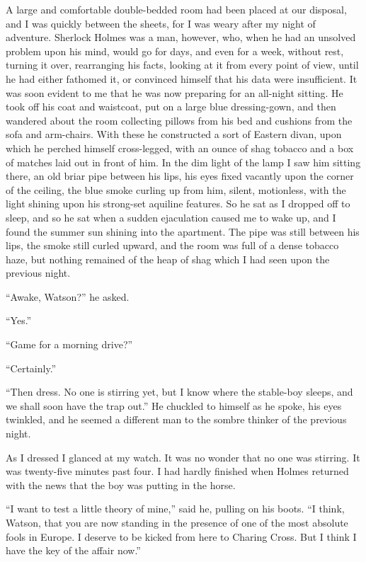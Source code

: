 A large and comfortable double-bedded room had been
placed at our disposal, and I was quickly between the sheets,
for I was weary after my night of adventure. Sherlock
Holmes was a man, however, who, when he had an unsolved
problem upon his mind, would go for days, and even for a
week, without rest, turning it over, rearranging his facts, looking
at it from every point of view, until he had either fathomed
it, or convinced himself that his data were insufficient.
It was soon evident to me that he was now preparing for an
all-night sitting. He took off his coat and waistcoat, put on
a large blue dressing-gown, and then wandered about the
room collecting pillows from his bed and cushions from the
sofa and arm-chairs. With these he constructed a sort of
Eastern divan, upon which he perched himself cross-legged,
with an ounce of shag tobacco and a box of matches laid out
in front of him. In the dim light of the lamp I saw him sitting
there, an old briar pipe between his lips, his eyes fixed
vacantly upon the corner of the ceiling, the blue smoke curling
up from him, silent, motionless, with the light shining upon
his strong-set aquiline features. So he sat as I dropped off
to sleep, and so he sat when a sudden ejaculation caused me
to wake up, and I found the summer sun shining into the
apartment. The pipe was still between his lips, the smoke
still curled upward, and the room was full of a dense tobacco
haze, but nothing remained of the heap of shag which I had
seen upon the previous night.

“Awake, Watson?” he asked.

“Yes.”

“Game for a morning drive?”

“Certainly.”

“Then dress. No one is stirring yet, but I know where the
stable-boy sleeps, and we shall soon have the trap out.” He
chuckled to himself as he spoke, his eyes twinkled, and he
seemed a different man to the sombre thinker of the previous
night.

As I dressed I glanced at my watch. It was no wonder
that no one was stirring. It was twenty-five minutes past
four. I had hardly finished when Holmes returned with the
news that the boy was putting in the horse.

“I want to test a little theory of mine,” said he, pulling on
his boots. “I think, Watson, that you are now standing in
the presence of one of the most absolute fools in Europe. I
deserve to be kicked from here to Charing Cross. But I think
I have the key of the affair now.”

